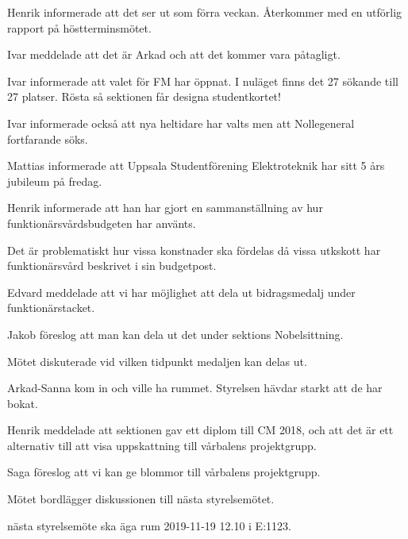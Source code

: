 \documentclass[10pt]{article}
\begin{document}
\begin{paragrafer}
\begin{paragrafer}
Henrik informerade att det ser ut som förra veckan. Återkommer med en utförlig rapport på höstterminsmötet. 
 
Ivar meddelade att det är Arkad och att det kommer vara påtagligt.

Ivar informerade att valet för FM har öppnat. I nuläget finns det 27 sökande till 27 platser. Rösta så sektionen får designa studentkortet!

Ivar informerade också att nya heltidare har valts men att Nollegeneral fortfarande söks.  


Mattias informerade att Uppsala Studentförening Elektroteknik har sitt 5 års jubileum på fredag. 

\end{paragrafer}

Henrik informerade att han har gjort en sammanställning av hur funktionärsvårdsbudgeten har använts.

Det är problematiskt hur vissa konstnader ska fördelas då vissa utkskott har funktionärsvård beskrivet i sin budgetpost. 



Edvard meddelade att vi har möjlighet att dela ut bidragsmedalj under funktionärstacket.

Jakob föreslog att man kan dela ut det under sektions Nobelsittning. 

Mötet diskuterade vid vilken tidpunkt medaljen kan delas ut. 

Arkad-Sanna kom in och ville ha rummet. Styrelsen hävdar starkt att de har bokat. 

Henrik meddelade att sektionen gav ett diplom till CM 2018, och att det är ett alternativ till att visa uppskattning till vårbalens projektgrupp.

Saga föreslog att vi kan ge blommor till vårbalens projektgrupp.  

Mötet bordlägger diskussionen till nästa styrelsemötet. 

\Mba nästa styrelsemöte ska äga rum 2019-11-19 12.10 i E:1123. 



\end{paragrafer}
\end{document}
